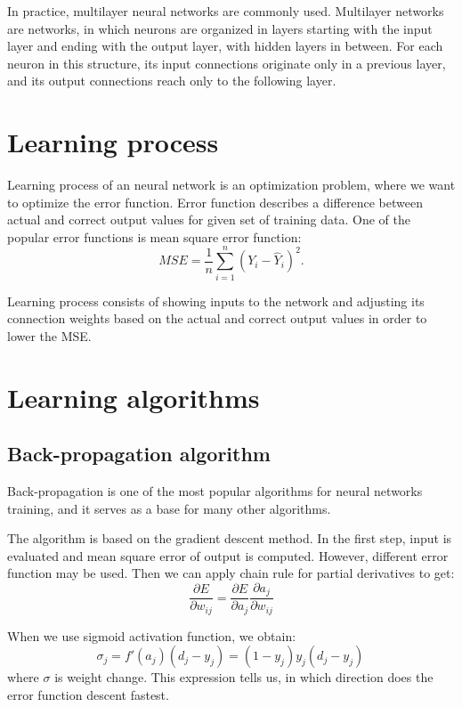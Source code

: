 In practice, multilayer neural networks are commonly used. Multilayer networks are networks, in which neurons are organized in layers starting with the input layer and ending with the output layer, with hidden layers in between. For each neuron in this structure, its input connections originate only in a previous layer, and its output connections reach only to the following layer. 

\section{Learning process}
Learning process of an neural network is an optimization problem, where we want to optimize the error function. Error function describes a difference between actual and correct output values for given set of training data. One of the popular error functions is mean square error function:
\begin{equation*}
MSE  =  \frac{1}{n} \sum_{i=1}^{n} (Y_{i} - \hat{Y}_{i})^2.
\end{equation*}

Learning process consists of showing inputs to the network and adjusting its connection weights based on the actual and correct output values in order to lower the MSE.

\section{Learning algorithms}

\subsection{Back-propagation algorithm}
Back-propagation is one of the most popular algorithms for neural networks training, and it serves as a base for many other algorithms.

The algorithm is based on the gradient descent method. In the first step, input is evaluated and mean square error of output is computed. However, different error function may be used. Then we can apply chain rule for partial derivatives to get:
\begin{equation*}
\frac{\partial E}{\partial w_{ij}} = \frac{\partial E}{\partial a_{j}} \frac{\partial a_{j}}{\partial w_{ij}}
\end{equation*}

When we use sigmoid activation function, we obtain:
\begin{equation*}
\sigma_{j}  =  f'(a_{j})(d_{j} - y_{j}) = (1-y_{j})y_{j}(d_{j}-y_{j})\,
\end{equation*}
where $\sigma$ is weight change. This expression tells us, in which direction does the error function descent fastest.

